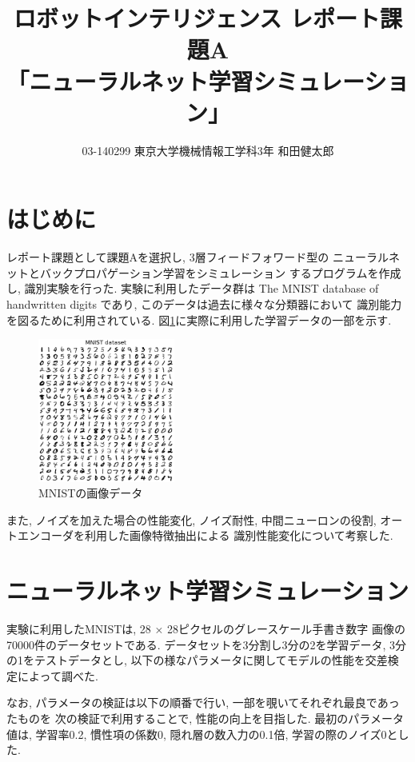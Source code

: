 \documentclass[10pt,a4paper,twocolumn]{jarticle}
\title{ロボットインテリジェンス レポート課題A \\
      「ニューラルネット学習シミュレーション」}
\author{03-140299 東京大学機械情報工学科3年 和田健太郎}
\begin{document}
\maketitle

\section{はじめに}
レポート課題として課題Aを選択し, 3層フィードフォワード型の
ニューラルネットとバックプロパゲーション学習をシミュレーション
するプログラムを作成し, 識別実験を行った. 
実験に利用したデータ群は
The MNIST database of handwritten digits
であり, このデータは過去に様々な分類器において
識別能力を図るために利用されている. \cite{mnist}
図\ref{fig:plot-mnist}に実際に利用した学習データの一部を示す. 

\begin{figure}[htbp]
  \centering
  \includegraphics[width=0.4\textwidth]{assets/img/tiled_mnist_nl0.0.eps}
  \caption{MNISTの画像データ}
  \label{fig:plot-mnist}
\end{figure}

また, ノイズを加えた場合の性能変化, ノイズ耐性, 
中間ニューロンの役割, オートエンコーダを利用した画像特徴抽出による
識別性能変化について考察した. 

\section{ニューラルネット学習シミュレーション}
実験に利用したMNISTは, 28 × 28ピクセルのグレースケール手書き数字
画像の70000件のデータセットである. 
データセットを3分割し3分の2を学習データ, 3分の1をテストデータとし, 
以下の様なパラメータに関してモデルの性能を交差検定によって調べた. 

なお, パラメータの検証は以下の順番で行い, 一部を覗いてそれぞれ最良であったものを
次の検証で利用することで, 性能の向上を目指した. 
最初のパラメータ値は, 学習率0.2, 慣性項の係数0, 
隠れ層の数入力の0.1倍, 学習の際のノイズ0とした. 
\end{document}
